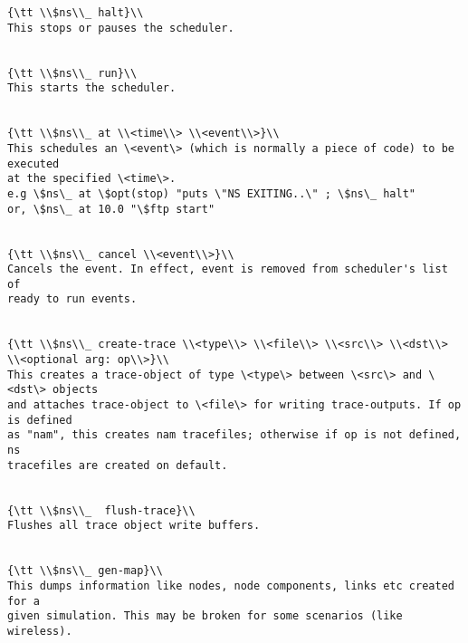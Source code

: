 \begin{verbatim}
{\tt \\$ns\\_ halt}\\
This stops or pauses the scheduler.


{\tt \\$ns\\_ run}\\
This starts the scheduler.


{\tt \\$ns\\_ at \\<time\\> \\<event\\>}\\
This schedules an \<event\> (which is normally a piece of code) to be executed
at the specified \<time\>.
e.g \$ns\_ at \$opt(stop) "puts \"NS EXITING..\" ; \$ns\_ halt"
or, \$ns\_ at 10.0 "\$ftp start"


{\tt \\$ns\\_ cancel \\<event\\>}\\
Cancels the event. In effect, event is removed from scheduler's list of 
ready to run events.


{\tt \\$ns\\_ create-trace \\<type\\> \\<file\\> \\<src\\> \\<dst\\> \\<optional arg: op\\>}\\
This creates a trace-object of type \<type\> between \<src\> and \<dst\> objects
and attaches trace-object to \<file\> for writing trace-outputs. If op is defined
as "nam", this creates nam tracefiles; otherwise if op is not defined, ns
tracefiles are created on default.


{\tt \\$ns\\_  flush-trace}\\
Flushes all trace object write buffers.


{\tt \\$ns\\_ gen-map}\\
This dumps information like nodes, node components, links etc created for a
given simulation. This may be broken for some scenarios (like wireless).



\end{verbatim}
